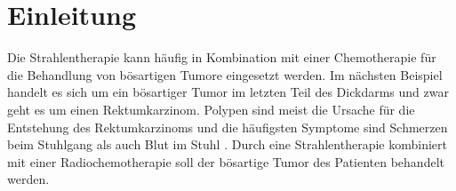\section{Einleitung}
\label{sec:Einleitung}
Die Strahlentherapie kann häufig in Kombination mit einer Chemotherapie für die Behandlung von bösartigen Tumore eingesetzt werden.
Im nächsten Beispiel handelt es sich um ein bösartiger Tumor im letzten Teil des Dickdarms und zwar geht es um einen Rektumkarzinom.
Polypen sind meist die Ursache für die Entstehung des Rektumkarzinoms und die häufigsten Symptome sind Schmerzen
beim Stuhlgang als auch Blut im Stuhl \cite{Rektum}.
Durch eine Strahlentherapie kombiniert mit einer Radiochemotherapie soll der bösartige Tumor des Patienten behandelt werden.
